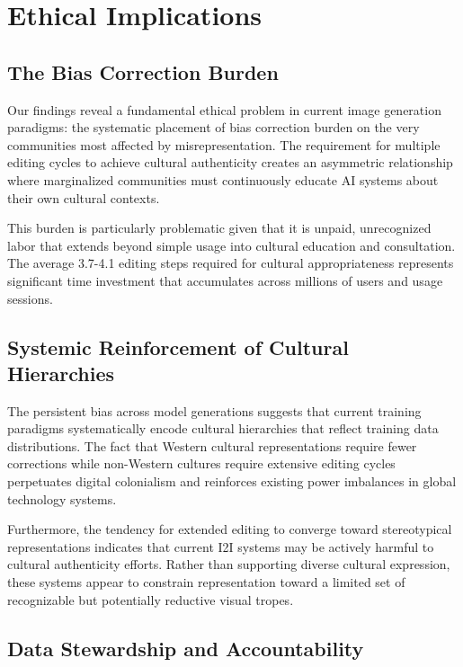 \documentclass{article}
\begin{document}
\section{Ethical Implications}

\subsection{The Bias Correction Burden}

Our findings reveal a fundamental ethical problem in current image generation paradigms: the systematic placement of bias correction burden on the very communities most affected by misrepresentation. The requirement for multiple editing cycles to achieve cultural authenticity creates an asymmetric relationship where marginalized communities must continuously educate AI systems about their own cultural contexts.

This burden is particularly problematic given that it is unpaid, unrecognized labor that extends beyond simple usage into cultural education and consultation. The average 3.7-4.1 editing steps required for cultural appropriateness represents significant time investment that accumulates across millions of users and usage sessions.

\subsection{Systemic Reinforcement of Cultural Hierarchies}

The persistent bias across model generations suggests that current training paradigms systematically encode cultural hierarchies that reflect training data distributions. The fact that Western cultural representations require fewer corrections while non-Western cultures require extensive editing cycles perpetuates digital colonialism and reinforces existing power imbalances in global technology systems.

Furthermore, the tendency for extended editing to converge toward stereotypical representations indicates that current I2I systems may be actively harmful to cultural authenticity efforts. Rather than supporting diverse cultural expression, these systems appear to constrain representation toward a limited set of recognizable but potentially reductive visual tropes.

\subsection{Data Stewardship and Accountability}
\end{document}
